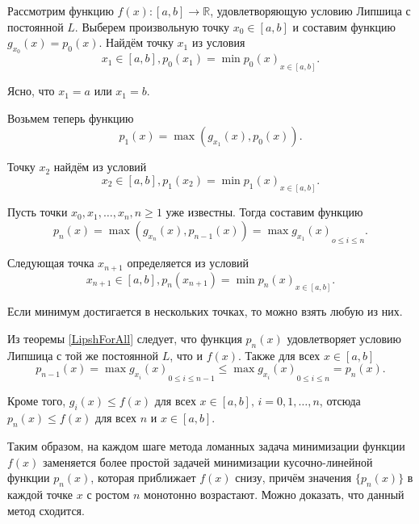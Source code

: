 Рассмотрим функцию $f(x) : [a, b] \to \mathbb{R}$, удовлетворяющую условию Липшица с постоянной $L$. Выберем произвольную точку $x_0 \in [a, b]$ и составим функцию $g_{x_0}(x) = p_0(x)$. Найдём точку $x_1$ из условия
\begin{equation*}
	x_1 \in [a, b], p_0(x_1) = \min{p_0(x)}_{x \in [a, b]}.
\end{equation*} 

Ясно, что $x_1 = a$ или $x_1 = b$.

Возьмем теперь функцию 
\begin{equation*}
	p_1(x) = \max(g_{x_1}(x), p_0(x)).
\end{equation*}

Точку $x_2$ найдём из условий 
\begin{equation*}
	x_2 \in [a, b], p_1(x_2) = \min{p_1(x)}_{x \in [a, b]}. 
\end{equation*}

Пусть точки $x_0, x_1, \dotsc, x_n, n \geqslant 1$ уже известны. Тогда составим функцию
\begin{equation*}
	p_n(x) = \max(g_{x_n}(x), p_{n - 1}(x)) = \max{g_{x_1}(x)}_{o \leqslant i \leqslant n}.
\end{equation*}

Следующая точка $x_{n + 1}$ определяется из условий 
\begin{equation*}
	x_{n + 1} \in [a, b], p_n(x_{n + 1}) = \min{p_n(x)}_{x \in [a, b]}.
\end{equation*}

Если минимум достигается в нескольких точках, то можно взять любую из них. 

Из теоремы \ref{LipshForAll} следует, что функция $p_n(x)$ удовлетворяет условию Липшица с той же постоянной $L$, что и $f(x)$. Также для всех $x \in [a, b]$
\begin{equation*}
	p_{n - 1}(x) = \max{g_{x_i}(x)}_{0 \leqslant i \leqslant n - 1} \leqslant \max{g_{x_i}(x)}_{0 \leqslant i \leqslant n} = p_n(x).
\end{equation*}

Кроме того, $g_i(x) \leqslant f(x)$ для всех $x \in [a, b], \, i = 0, 1, \dotsc, n$, отсюда $p_n(x) \leqslant f(x)$ для всех $n$ и $x \in [a, b]$.

Таким образом, на каждом шаге метода ломанных задача минимизации функции $f(x)$ заменяется более простой задачей минимизации кусочно-линейной функции $p_n(x)$, которая приближает $f(x)$ снизу, причём значения $\{p_n(x)\}$ в каждой точке $x$ с ростом $n$ монотонно возрастают. Можно доказать, что данный метод сходится.
